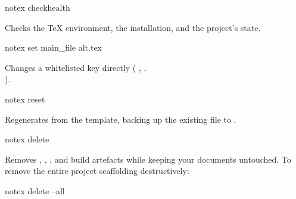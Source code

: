 \documentclass[../main.tex]{subfiles}
\begin{document}
\begin{bash}
    notex checkhealth
\end{bash}

Checks the \TeX{} environment, the installation, and the project's state.

\begin{bash}
    notex set main_file alt.tex
\end{bash}

Changes a whitelisted  key directly ( , ,\\ ).

\begin{bash}
    notex reset
\end{bash}

Regenerates  from the template, backing up the existing file to .

\begin{bash}
    notex delete
\end{bash}

Removes , , , and build artefacts while keeping your documents untouched.
To remove the entire project scaffolding destructively:

\begin{bash}
    notex delete --all
\end{bash}
\end{document}
